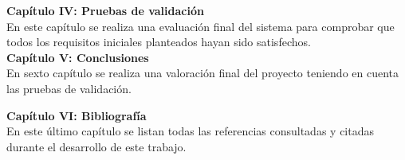 \noindent \textbf{Capítulo IV: Pruebas de validación}\\
En este capítulo se realiza una evaluación final del sistema para comprobar que todos los requisitos iniciales planteados hayan sido satisfechos.\\

\noindent \textbf{Capítulo V: Conclusiones}\\
En sexto capítulo se realiza una valoración final del proyecto teniendo en cuenta las pruebas de validación.

\noindent \textbf{Capítulo VI: Bibliografía}\\
En este último capítulo se listan todas las referencias consultadas y citadas durante el desarrollo de este trabajo. 